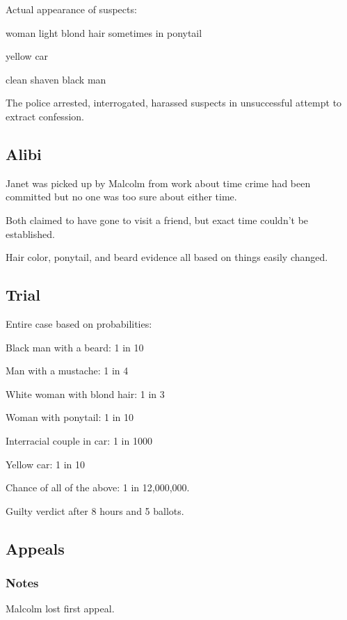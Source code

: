 \documentclass[letterpaper, landscape]{exam}
\begin{document}
  Actual appearance of suspects:
  \begin{itemize*}
    \item woman light blond hair sometimes in ponytail
    \item yellow car
    \item clean shaven black man
  \end{itemize*}

  The police arrested, interrogated, harassed suspects in unsuccessful attempt
  to extract confession.

  \subsection{Alibi}

  Janet was picked up by Malcolm from work about time crime had been committed
  but no one was too sure about either time.

  Both claimed to have gone to visit a friend, but exact time couldn't be
  established.

  Hair color, ponytail, and beard evidence all based on things easily changed.

  \subsection{Trial}
  Entire case based on probabilities:
  \begin{itemize*}
    \item Black man with a beard: 1 in 10
    \item Man with a mustache: 1 in 4
    \item White woman with blond hair: 1 in 3
    \item Woman with ponytail: 1 in 10
    \item Interracial couple in car: 1 in 1000
    \item Yellow car: 1 in 10
  \end{itemize*}

  Chance of all of the above: 1 in 12,000,000.

  Guilty verdict after 8 hours and 5 ballots.

  \subsection{Appeals}

  \subsubsection{Notes}
  Malcolm lost first appeal.
\end{document}
